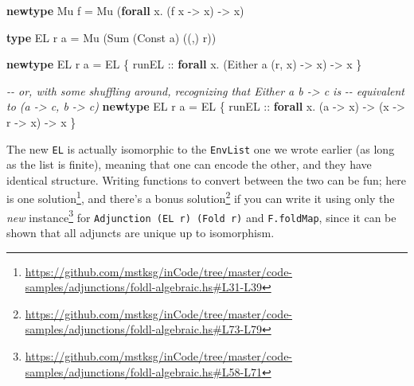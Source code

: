 \documentclass[]{article}
\newenvironment{Shaded}{}{}
\newcommand{\CommentTok}[1]{\textcolor[rgb]{0.38,0.63,0.69}{\textit{#1}}}
\newcommand{\DataTypeTok}[1]{\textcolor[rgb]{0.56,0.13,0.00}{#1}}
\newcommand{\KeywordTok}[1]{\textcolor[rgb]{0.00,0.44,0.13}{\textbf{#1}}}
\newcommand{\NormalTok}[1]{#1}
\newcommand{\OperatorTok}[1]{\textcolor[rgb]{0.40,0.40,0.40}{#1}}
\newcommand{\OtherTok}[1]{\textcolor[rgb]{0.00,0.44,0.13}{#1}}
\renewcommand{\href}[2]{#2\footnote{\url{#1}}}
\begin{document}
\begin{Shaded}
\begin{Highlighting}[]
\KeywordTok{newtype} \DataTypeTok{Mu}\NormalTok{ f }\OtherTok{=} \DataTypeTok{Mu}\NormalTok{ (}\KeywordTok{forall}\NormalTok{ x}\OperatorTok{.}\NormalTok{ (f x }\OtherTok{{-}\textgreater{}}\NormalTok{ x) }\OtherTok{{-}\textgreater{}}\NormalTok{ x)}

\KeywordTok{type} \DataTypeTok{EL}\NormalTok{ r a }\OtherTok{=} \DataTypeTok{Mu}\NormalTok{ (}\DataTypeTok{Sum}\NormalTok{ (}\DataTypeTok{Const}\NormalTok{ a) ((,) r))}

\KeywordTok{newtype} \DataTypeTok{EL}\NormalTok{ r a }\OtherTok{=} \DataTypeTok{EL}\NormalTok{ \{}
\OtherTok{    runEL ::} \KeywordTok{forall}\NormalTok{ x}\OperatorTok{.}\NormalTok{ (}\DataTypeTok{Either}\NormalTok{ a (r, x) }\OtherTok{{-}\textgreater{}}\NormalTok{ x) }\OtherTok{{-}\textgreater{}}\NormalTok{ x}
\NormalTok{  \}}

\CommentTok{{-}{-} or, with some shuffling around, recognizing that \textasciigrave{}Either a b {-}\textgreater{} c\textasciigrave{} is}
\CommentTok{{-}{-} equivalent to \textasciigrave{}(a {-}\textgreater{} c, b {-}\textgreater{} c)\textasciigrave{}}
\KeywordTok{newtype} \DataTypeTok{EL}\NormalTok{ r a }\OtherTok{=} \DataTypeTok{EL}\NormalTok{ \{}
\OtherTok{    runEL ::} \KeywordTok{forall}\NormalTok{ x}\OperatorTok{.}\NormalTok{ (a }\OtherTok{{-}\textgreater{}}\NormalTok{ x) }\OtherTok{{-}\textgreater{}}\NormalTok{ (x }\OtherTok{{-}\textgreater{}}\NormalTok{ r }\OtherTok{{-}\textgreater{}}\NormalTok{ x) }\OtherTok{{-}\textgreater{}}\NormalTok{ x}
\NormalTok{  \}}
\end{Highlighting}
\end{Shaded}

The new \texttt{EL} is actually isomorphic to the \texttt{EnvList} one we wrote
earlier (as long as the list is finite), meaning that one can encode the other,
and they have identical structure. Writing functions to convert between the two
can be fun;
\href{https://github.com/mstksg/inCode/tree/master/code-samples/adjunctions/foldl-algebraic.hs\#L31-L39}{here
is one solution}, and there's a
\href{https://github.com/mstksg/inCode/tree/master/code-samples/adjunctions/foldl-algebraic.hs\#L73-L79}{bonus
solution} if you can write it using only the
\href{https://github.com/mstksg/inCode/tree/master/code-samples/adjunctions/foldl-algebraic.hs\#L58-L71}{\emph{new}
instance} for \texttt{Adjunction\ (EL\ r)\ (Fold\ r)} and \texttt{F.foldMap},
since it can be shown that all adjuncts are unique up to isomorphism.
\end{document}
